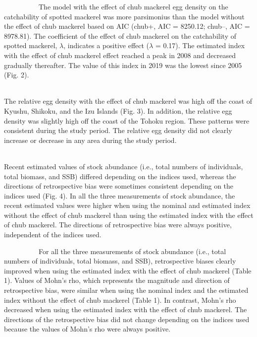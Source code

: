 \documentclass[12pt]{article}
\begin{document}
\begin{linenumbers}
\ \ \ \ \ \ \ \ \ \ 
The model with the effect of chub mackerel egg density on the catchability of spotted mackerel was more parsimonius than the model without the effect of chub mackerel based on AIC (chub+, AIC = 8250.12; chub--, AIC = 8978.81). The coefficient of the effect of chub mackerel on the catchability of spotted mackerel, $\lambda$, indicates a positive effect ($\lambda$ = 0.17). The estimated index with the effect of chub mackerel effect reached a peak in 2008 and decreased gradually thereafter. The value of this index in 2019 was the lowest since 2005 (Fig. 2).

\\
The relative egg density with the effect of chub mackerel was high off the coast of Kyushu, Shikoku, and the Izu Islands (Fig. 3). In addition, the relative egg density was slightly high off the coast of the Tohoku region. These patterns were consistent during the study period. The relative egg density did not clearly increase or decrease in any area during the study period.

\\
Recent estimated values of stock abundance (i.e., total numbers of individuals, total biomass, and SSB) differed depending on the indices used, whereas the directions of retrospective bias were sometimes consistent depending on the indices used (Fig. 4). In all the three measurements of stock abundance, the recent estimated values were higher when using the nominal and estimated index without the effect of chub mackerel than using the estimated index with the effect of chub mackerel. The directions of retrospective bias were always positive, independent of the indices used.

\ \ \ \ \ \ \ \ \ \ 
For all the three measurements of stock abundance (i.e., total numbers of individuals, total biomass, and SSB), retrospective biases clearly improved when using the estimated index with the effect of chub mackerel (Table 1). Values of Mohn's rho, which represents the magnitude and direction of retrospective bias, were similar when using the nominal index and the estimated index without the effect of chub mackerel (Table 1). In contrast, Mohn's rho decreased when using the estimated index with the effect of chub mackerel. The directions of the retrospective bias did not change depending on the indices used because the values of Mohn's rho were always positive.



\end{linenumbers}
\end{document}
